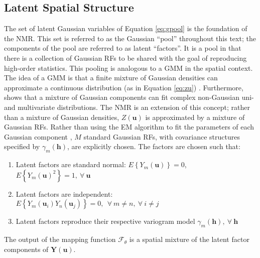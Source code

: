 
\subsection{Latent Spatial Structure}
\label{subsec:03latent}

The set of latent Gaussian variables of Equation \ref{eq:gpool} is the foundation of the \gls{NMR}. This set is referred to as the Gaussian ``pool'' throughout this text; the components of the pool are referred to as latent ``factors''. It is a pool in that there is a collection of Gaussian \glspl{RF} to be shared with the goal of reproducing high-order statistics. This pooling is analogous to a \gls{GMM} in the spatial context. The idea of a \gls{GMM} is that a finite mixture of Gaussian densities can approximate a continuous distribution (as in Equation \ref{eq:zu}) \citep{mclachlan2019finite}. Furthermore, \cite{silva2018multivariate} shows that a mixture of Gaussian components can fit complex non-Gaussian uni- and multivariate distributions. The \gls{NMR} is an extension of this concept; rather than a mixture of Gaussian densities, $Z(\mathbf{u})$ is approximated by a mixture of Gaussian \glspl{RF}. Rather than using the \acrlong{EM} algorithm to fit the parameters of each Gaussian component \citep{mclachlan2019finite}, $M$ standard Gaussian \glspl{RF}, with covariance structures specified by $\gamma_{m}(\mathbf{h})$, are explicitly chosen. The factors are chosen such that:
\begin{enumerate}[noitemsep]
    \item Latent factors are standard normal: $E\left\{Y_{m}(\mathbf{u})\right\}=0$, \ $E\left\{Y_{m}(\mathbf{u})^{2}\right\}=1, \ \forall \ \mathbf{u}$
    \item Latent factors are independent: $E\left\{Y_{m}(\mathbf{u}_{i})Y_{n}(\mathbf{u}_{j})\right\}=0, \ \ \forall \ m\neq n, \ \forall \ i \neq j$
    \item Latent factors reproduce their respective variogram model $\gamma_m(\mathbf{h}), \ \forall \ \mathbf{h}$
\end{enumerate}
The output of the mapping function $\mathcal{F}_{\theta}$ is a spatial mixture of the latent factor components of $\mathbf{Y}(\mathbf{u})$.

